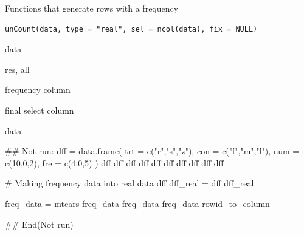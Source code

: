 \documentclass[a4paper]{book}
\begin{document}
%
\begin{Description}
Functions that generate rows with a frequency
\end{Description}
%
\begin{Usage}
\begin{verbatim}
unCount(data, type = "real", sel = ncol(data), fix = NULL)
\end{verbatim}
\end{Usage}
%
\begin{Arguments}
\begin{ldescription}
\item[\code{data}] data

\item[\code{type}] res, all

\item[\code{sel}] frequency column

\item[\code{fix}] final select column
\end{ldescription}
\end{Arguments}
%
\begin{Value}
data
\end{Value}
%
\begin{Examples}
\begin{ExampleCode}

\#\# Not run: 
dff = data.frame(
  trt = c("r","s","z"),
  con = c("f","m","l"),
  num = c(10,0,2),
  fre = c(4,0,5) )
dff
dff %
dff %
dff %
dff %
dff %
dff %
dff %
dff %
dff %

# Making frequency data into real data
dff %
 dff_real =  dff %
 dff_real

 freq_data =  mtcars %
 freq_data%
 freq_data%
 freq_data%
rowid_to_column

## End(Not run)

\end{ExampleCode}
\end{Examples}
\end{document}
